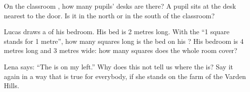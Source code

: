 \begin{exercise}[$\star\star$]\label{exo:g2:drawing-to-map:9}
On the classroom , how many pupils' desks are there? A pupil sits at
the desk nearest to the door. Is it in the north or in the south of the
classroom?
\end{exercise}

\begin{exercise}[$\star\star$]\label{exo:g2:drawing-to-map:10}
Lucas draws a  of his bedroom. His bed is 2 metres long. With the 
``1 square stands for 1 metre'', how many squares long is the bed on his
? His bedroom is 4 metres long and 3 metres wide: how many squares does
the whole room cover?
\end{exercise}

\begin{exercise}[$\star\star$]\label{exo:g2:drawing-to-map:11}
Lena says: ``The  is on my left.'' Why does this not tell us where the
 is? Say it again in a way that is true for everybody, if she stands on
the farm of the Varden Hills.
\end{exercise}
